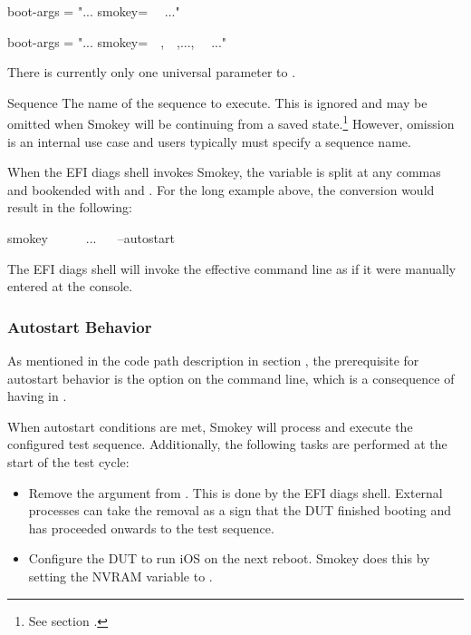 \begin{Setting}
boot-args = "... smokey=~~ ..."
\end{Setting}

\begin{Setting}
boot-args = "... smokey=~~,~~,...,~~ ..."
\end{Setting}

There is currently only one universal parameter to .

\begin{Definition}

	\item[Sequence] The name of the sequence to execute.  This is ignored
	and may be omitted when Smokey will be continuing from a saved
	state.\footnote{See section .}  However,
	omission is an internal use case and users typically must specify a
	sequence name.

\end{Definition}

When the EFI diags shell invokes Smokey, the  variable is split
at any commas and bookended with  and .
For the long  example above, the conversion would result in
the following:

\begin{Setting}
smokey ~~ ~~ ... ~~ --autostart
\end{Setting}

The EFI diags shell will invoke the effective command line as if it were
manually entered at the console.

\subsubsection{Autostart Behavior}

As mentioned in the code path description in section ,
the prerequisite for autostart behavior is the  option on
the command line, which is a consequence of having  in
.

When autostart conditions are met, Smokey will process and execute the
configured test sequence.  Additionally, the following tasks are performed at
the start of the test cycle:

\begin{itemize}

	\item Remove the  argument from .  This
	is done by the EFI diags shell.  External processes can take the
	removal as a sign that the DUT finished booting and has proceeded
	onwards to the test sequence.

	\item Configure the DUT to run iOS on the next reboot.  Smokey does
	this by setting the  NVRAM variable to
	.

\end{itemize}

